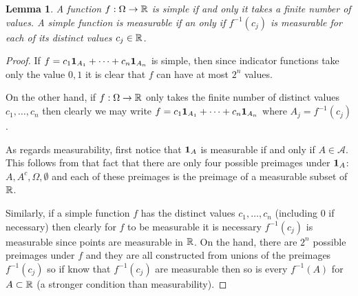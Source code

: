 \documentclass{amsart}
\newtheorem{lem}[thm]{Lemma}
\theoremstyle{remark}
\theoremstyle{definition}
\begin{document}
\begin{lem}\label{SimpleFunctions}A function $f : \Omega \to \mathbb{R}$ is simple if and only it
  takes a finite number of values.  A simple function is measurable if
  an only if $f^{-1}(c_j)$ is measurable for each of its distinct
  values $c_j \in \mathbb{R}$.
\end{lem}
\begin{proof}
If $f = c_1  \textbf{1}_{A_1} + \cdots + c_n \textbf{1}_{A_n}$
is simple, then since indicator functions take only the value ${0,1}$
it is clear that $f$ can have at most $2^n$ values.

On the other hand, if $f : \Omega \to \mathbb{R}$ only takes the finite
number of distinct values $c_1, \dots, c_n$ then clearly we may write 
$f = c_1  \textbf{1}_{A_1} + \cdots + c_n \textbf{1}_{A_n}$
where $A_j = f^{-1}(c_j)$.

As regards measurability, first notice that $\textbf{1}_{A}$ is
measurable if and only if $A \in  \mathcal{A}$.  This follows from
that fact that there are only four possible preimages under
$\textbf{1}_{A}$: $A, A^c, \Omega, \emptyset$ and each of these
preimages is the preimage of a measurable subset of $\mathbb{R}$.

Similarly, if a simple function $f$ has the distinct values $c_1, \dots,
c_n$ (including $0$ if necessary) then clearly for $f$ to be
measurable it is necessary $f^{-1}(c_j)$ is measurable since points
are measurable in $\mathbb{R}$.   On the hand, there are $2^n$ possible preimages under $f$ and they are all
constructed from unions of the preimages $f^{-1}(c_j)$ so if know that
$f^{-1}(c_j)$ are measurable then so is every $f^{-1}(A)$ for $A
\subset \mathbb{R}$ (a stronger condition than measurability).
\end{proof}
\end{document}
